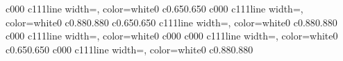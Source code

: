 \documentclass{standalone}
\begin{document}
\begin{knitdiagram}
{c}{0}{0}{0}
{c}{1}{1}{1}{line width=\outlineThickness*\dx, color=white}{0}
{c}{0.65}{0.65}{0}
{c}{0}{0}{0}
{c}{1}{1}{1}{line width=\outlineThickness*\dx, color=white}{0}
{c}{0.88}{0.88}{0}
{c}{0.65}{0.65}{0}
{c}{1}{1}{1}{line width=\outlineThickness*\dx, color=white}{0}
{c}{0.88}{0.88}{0}
{c}{0}{0}{0}
{c}{1}{1}{1}{line width=\outlineThickness*\dx, color=white}{0}
{c}{0}{0}{0}
{c}{0}{0}{0}
{c}{1}{1}{1}{line width=\outlineThickness*\dx, color=white}{0}
{c}{0.65}{0.65}{0}
{c}{0}{0}{0}
{c}{1}{1}{1}{line width=\outlineThickness*\dx, color=white}{0}
{c}{0.88}{0.88}{0}
\end{knitdiagram}
\end{document}
